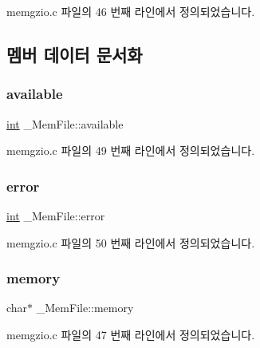 memgzio.\+c 파일의 46 번째 라인에서 정의되었습니다.



\subsection{멤버 데이터 문서화}
\mbox{\label{struct___mem_file_a1f48066353e37cf16c9a0065abecf238}} 
\subsubsection{\texorpdfstring{available}{available}}
{\footnotesize\ttfamily \mbox{\hyperlink{_util_8cpp_a0ef32aa8672df19503a49fab2d0c8071}{int}} \+\_\+\+Mem\+File\+::available}



memgzio.\+c 파일의 49 번째 라인에서 정의되었습니다.

\mbox{\label{struct___mem_file_a63100edd8050f287d8dc7070d92a55cb}} 
\subsubsection{\texorpdfstring{error}{error}}
{\footnotesize\ttfamily \mbox{\hyperlink{_util_8cpp_a0ef32aa8672df19503a49fab2d0c8071}{int}} \+\_\+\+Mem\+File\+::error}



memgzio.\+c 파일의 50 번째 라인에서 정의되었습니다.

\mbox{\label{struct___mem_file_a62a96f96df82e23ef6dace974e19b18c}} 
\subsubsection{\texorpdfstring{memory}{memory}}
{\footnotesize\ttfamily char$\ast$ \+\_\+\+Mem\+File\+::memory}



memgzio.\+c 파일의 47 번째 라인에서 정의되었습니다.

\mbox{\label{struct___mem_file_a88cb51a4419fad64ebfd304b5d0cfe36}} 
